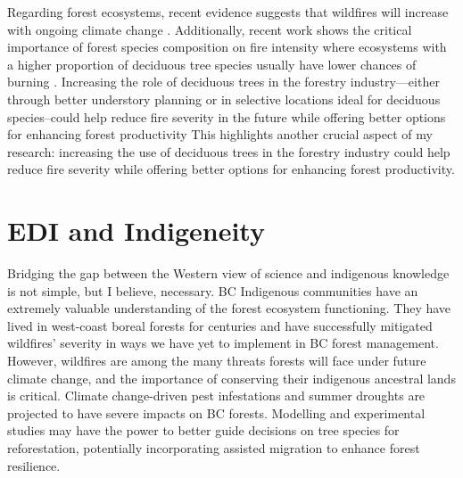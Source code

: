 \documentclass[11pt,letter]{article}
\begin{document}
Regarding forest ecosystems, recent evidence suggests that wildfires will increase with ongoing climate change \citep{wasserman_climate_2023}. 
Additionally, recent work shows the critical importance of forest species composition on fire intensity where ecosystems with a higher proportion of deciduous tree species usually have lower chances of burning \citep{park_impact_2024}. 
Increasing the role of deciduous trees in the forestry industry---either through better understory planning or in selective locations ideal for deciduous species--could help reduce fire severity in the future while offering better options for enhancing forest productivity
This highlights another crucial aspect of my research: increasing the use of deciduous trees in the forestry industry could help reduce fire severity while offering better options for enhancing forest productivity.


\section *{EDI and Indigeneity}
Bridging the gap between the Western view of science and indigenous knowledge is not simple, but I believe, necessary. BC Indigenous communities have an extremely valuable understanding of the forest ecosystem functioning. They have lived in west-coast boreal forests for centuries and have successfully mitigated wildfires' severity in ways we have yet to implement in BC forest management. However, wildfires are among the many threats forests will face under future climate change, and the importance of conserving their indigenous ancestral lands is critical. Climate change-driven pest infestations and summer droughts are projected to have severe impacts on BC forests. \citep{williams_climate_2002} Modelling and experimental studies may have the power to better guide decisions on tree species for reforestation, potentially incorporating assisted migration to enhance forest resilience. \citep{aitken_time_2016}
\end{document}
